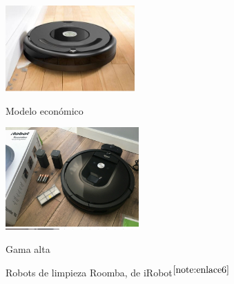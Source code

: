 \begin{figure}[ht!]
	\centering
	\begin{minipage}{0.3\linewidth}
		\centering
		\includegraphics[width=\linewidth]{figs/gama-baja.png}
		\caption*{\centering Modelo económico }%
	\end{minipage}
	\hspace{3cm}
	\begin{minipage}{0.3\linewidth}
		\centering
		\includegraphics[width=\linewidth]{figs/gama-alta.png}
		\caption*{\centering Gama alta} %
	\end{minipage}
	\caption{Robots de limpieza Roomba, de iRobot$^{\ref{note:enlace6}}$}
	\label{fig:roblimpieza}
\end{figure}

